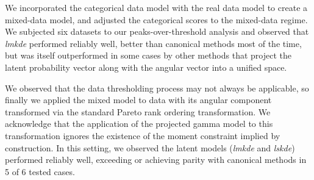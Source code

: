 We incorporated the categorical data model with the real data model to create a 
    mixed-data model, and adjusted the categorical scores to the mixed-data 
    regime.  We subjected six datasets to our peaks-over-threshold analysis and 
    observed that \emph{lmkde} performed reliably well, better than canonical 
    methods most of the time, but was itself outperformed in some cases by other 
    methods that project the latent probability vector along with the angular 
    vector into a unified space.

We observed that the data thresholding process may not always be applicable, so 
    finally we applied the mixed model to data with its angular component 
    transformed via the standard Pareto rank ordering transformation.  We
    acknowledge that the application of the projected gamma model to this
    transformation ignores the existence of the moment constraint implied by
    construction. In this setting, we observed the latent models (\emph{lmkde} 
    and \emph{lskde}) performed reliably well, exceeding or achieving parity
    with canonical methods in 5 of 6 tested cases.

